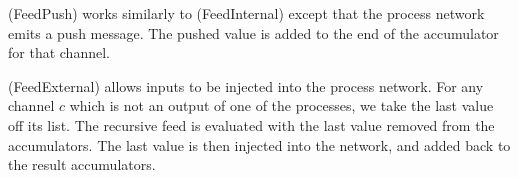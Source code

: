 (FeedPush) works similarly to (FeedInternal) except that the process network emits a push message.
The pushed value is added to the end of the accumulator for that channel.

(FeedExternal) allows inputs to be injected into the process network.
For any channel $c$ which is not an output of one of the processes, we take the last value off its list.
The recursive feed is evaluated with the last value removed from the accumulators.
The last value is then injected into the network, and added back to the result accumulators.

